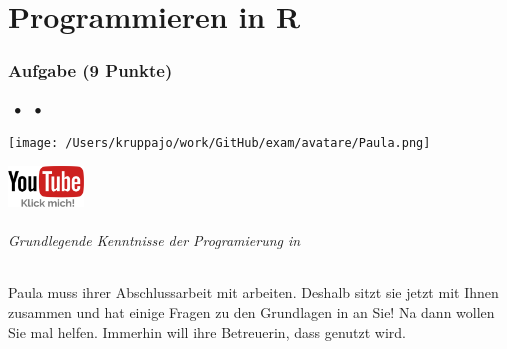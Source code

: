 \documentclass[a4paper, 9pt]{scrartcl}\usepackage[]{graphicx}\usepackage[]{xcolor}
\begin{document}
\clearpage
\part{Programmieren in R}

\section{Aufgabe \hfill (9 Punkte)}



 
\ifcollection
\begin{flushright}
\tiny\vspace{-3Ex}
\textbf{\examinhaltstart}
\exammodulemathstat $\;\bullet$
\exammodulelanddaten $\;\bullet$
\exammodulestat 
\vspace{-4Ex}
\end{flushright}
\begin{minipage}[t]{0.5\textwidth}
\texttt{[image: /Users/kruppajo/work/GitHub/exam/avatare/Paula.png]}
\end{minipage}
\begin{minipage}[t]{0.5\textwidth}
\hfill
\href{https://www.youtube.com/playlist?list=PLe51bCp9JvEFUnFqaJG5aRmON9i1ZbOYC}{\includegraphics[width = 2cm]{img/youtube}}
\end{minipage}
\vspace{-3ex}
\fi



\ifcollection
\paragraph{Grundlegende Kenntnisse der Programierung in \Rlogo}
\fi

Paula muss ihrer Abschlussarbeit mit \Rlogo arbeiten. Deshalb sitzt sie jetzt mit Ihnen zusammen und hat einige Fragen zu den Grundlagen in \Rlogo an Sie! Na dann wollen Sie mal helfen. Immerhin will ihre Betreuerin, dass \Rlogo genutzt wird.\\[1Ex]
\end{document}
